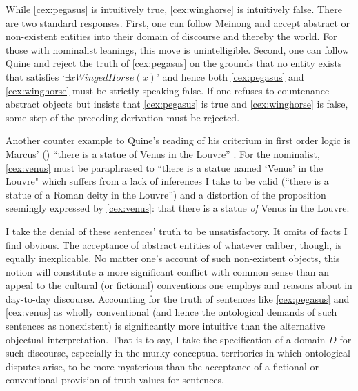 While \eqref{cex:pegasus} is intuitively true, \eqref{cex:winghorse}
is intuitively false.  There are
two standard responses.
  First, one can follow Meinong and accept
abstract or non-existent entities into their domain of discourse and
thereby the world.  For those with nominalist leanings, this move is
unintelligible.  Second, one can follow Quine and reject the truth of
\eqref{cex:pegasus} on the grounds that no entity exists that satisfies `$\exists
xWingedHorse(x)$' and hence both \eqref{cex:pegasus} and \eqref{cex:winghorse} must be strictly speaking
false. If one refuses to countenance abstract objects but insists
that \eqref{cex:pegasus} is true and \eqref{cex:winghorse} is false, some step of the preceding
derivation must be rejected.

Another counter example to Quine's reading of his criterium in first
order logic is Marcus' (\cex) ``there is a statue of
Venus in the Louvre''\label{cex:venus} \cite{marcus72}.  For the
nominalist, \eqref{cex:venus} must
be paraphrased to ``there is a statue named `Venus' in the Louvre"
which suffers from a lack of inferences I take to be valid (``there is
a statue of a Roman deity in the Louvre'') and a distortion of the
proposition seemingly expressed by \eqref{cex:venus}: that there is a statue
\emph{of} Venus in the Louvre.

I take the denial of these sentences' truth to be unsatisfactory.
It omits of facts I find obvious.  
 The acceptance of abstract entities of whatever
caliber, though, is equally inexplicable.  
No matter one's account of such non-existent objects, this notion will 
constitute a more significant conflict with common sense than an 
appeal to the cultural
(or fictional) conventions one employs and reasons about in day-to-day
discourse. Accounting for the truth of sentences like \eqref{cex:pegasus} and \eqref{cex:venus} as
wholly conventional (and hence the ontological demands of such
sentences as nonexistent) is significantly more intuitive than the
alternative objectual interpretation.
  That is to say, I take the
specification of a domain $D$ for such discourse, especially in the
murky conceptual territories in which ontological disputes arise, to
be more mysterious than the acceptance of a fictional or conventional
provision of truth values for sentences.

